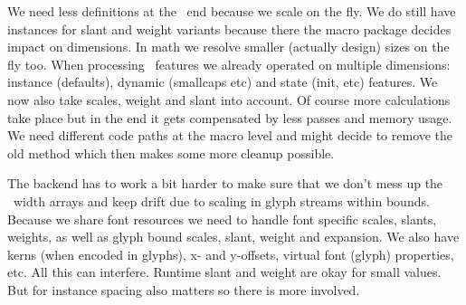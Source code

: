 \startitemize
\startitem
    We need less definitions at the \TEX\ end because we scale on the fly.
\stopitem
\startitem
    We do still have instances for slant and weight variants because there
    the macro package decides impact on dimensions.
\stopitem
\startitem
    In math we resolve smaller (actually design) sizes on the fly too.
\stopitem
\startitem
    When processing \OPENTYPE\ features we already operated on multiple
    dimensions: instance (defaults), dynamic (smallcaps etc) and state (init,
    etc) features. We now also take scales, weight and slant into account.
\stopitem
\startitem
    Of course more calculations take place but in the end it gets compensated by
    less passes and memory usage.
\stopitem
\startitem
    We need different code paths at the macro level and might decide to remove
    the old method which then makes some more cleanup possible.
\stopitem
\stopitemize

\stoptitle

\starttitle[title=Tricky]

\startitemize
\startitem
    The backend has to work a bit harder to make sure that we don't mess up the
    \PDF\ width arrays and keep drift due to scaling in glyph streams
    within bounds.
\stopitem
\startitem
    Because we share font resources we need to handle font specific scales,
    slants, weights, as well as glyph bound scales, slant, weight and
    expansion.
\stopitem
\startitem
    We also have kerns (when encoded in glyphs), x- and y-offsets, virtual
    font (glyph) properties, etc. All this can interfere.
\stopitem
\startitem
    {\showglyphs Runtime { slant} and { weight} are okay for small values.}
\stopitem
\startitem
    But for instance spacing also matters so there is more involved.
\stopitem
\stopitemize

\stoptitle

\stopdocument

